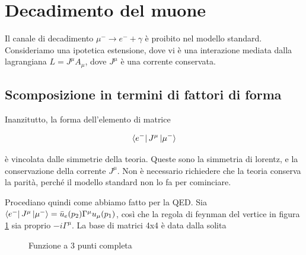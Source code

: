 \documentclass[11pt]{report}
\begin{document}
\newpage

\section{Decadimento del muone}

Il canale di decadimento \(\mu^- \to e^- + \gamma\) è proibito nel modello standard. Consideriamo una ipotetica estensione, dove vi è una interazione mediata dalla lagrangiana \(L = J^\mu A_\mu\), dove \(J^\mu\) è una corrente conservata.

\subsection{Scomposizione in termini di fattori di forma}

Inanzitutto, la forma dell'elemento di matrice 

\begin{align}
    \bra{e^-}J^\mu \ket{\mu^-}
\end{align}

è vincolata dalle simmetrie della teoria. Queste sono la simmetria di lorentz, e la conservazione della corrente \(J^\mu\). Non è necessario richiedere che la teoria conserva la parità, perché il modello standard non lo fa per cominciare. 

Procediano quindi come abbiamo fatto per la QED. Sia \(\bra{e^-}J^\mu \ket{\mu^-} = \bar{u}_e(p_2) \Gamma^\mu u_\mu(p_1)\), così che la regola di feynman del vertice in figura \ref{fig:emugammavertex} sia proprio \(-i\Gamma^\mu\). La base di matrici 4x4 è data dalla solita 

\begin{figure}
    \caption{Funzione a 3 punti completa}
    \label{fig:emugammavertex}
    \begin{center}
    \end{center}
\end{figure}
\end{document}
